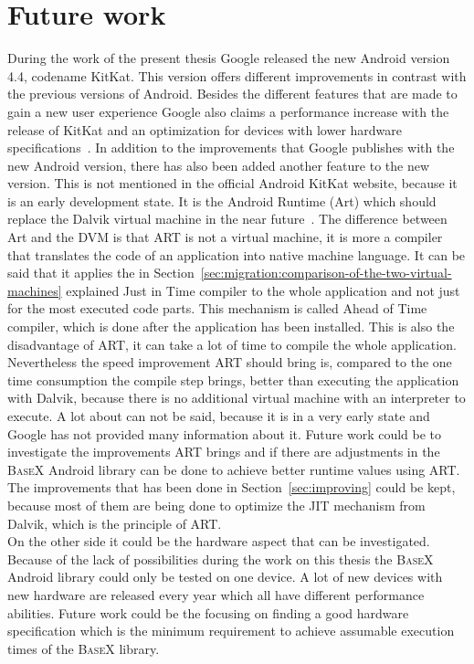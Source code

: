 \section{Future work}
\label{sec:summery:future-work}
During the work of the present thesis Google released the new Android version 4.4, codename KitKat.
This version offers different improvements in contrast with the previous versions of Android.
Besides the different features that are made to gain a new user experience Google also claims a performance increase with the release of KitKat and an optimization for devices with lower hardware specifications~\cite{google-kitkat}.
In addition to the improvements that Google publishes with the new Android version, there has also been added another feature to the new version.
This is not mentioned in the official Android KitKat website, because it is an early development state.
It is the Android Runtime (Art) which should replace the Dalvik virtual machine in the near future~\cite{android-art}.
The difference between Art and the DVM is that ART is not a virtual machine, it is more a compiler that translates the code of an application into native machine language.
It can be said that it applies the in Section~\ref{sec:migration:comparison-of-the-two-virtual-machines} explained Just in Time compiler to the whole application and not just for the most executed code parts.
This mechanism is called Ahead of Time compiler, which is done after the application has been installed.
This is also the disadvantage of ART, it can take a lot of time to compile the whole application.
Nevertheless the speed improvement ART should bring is, compared to the one time consumption the compile step brings, better than executing the application with Dalvik, because there is no additional virtual machine with an interpreter to execute.
A lot about can not be said, because it is in a very early state and Google has not provided many information about it.
Future work could be to investigate the improvements ART brings and if there are adjustments in the \textsc{BaseX} Android library can be done to achieve better runtime values using ART.
The improvements that has been done in Section~\ref{sec:improving} could be kept, because most of them are being done to optimize the JIT mechanism from Dalvik, which is the principle of ART.\\
On the other side it could be the hardware aspect that can be investigated.
Because of the lack of possibilities during the work on this thesis the \textsc{BaseX} Android library could only be tested on one device.
A lot of new devices with new hardware are released every year which all have different performance abilities.
Future work could be the focusing on finding a good hardware specification which is the minimum requirement to achieve assumable execution times of the \textsc{BaseX} library.
